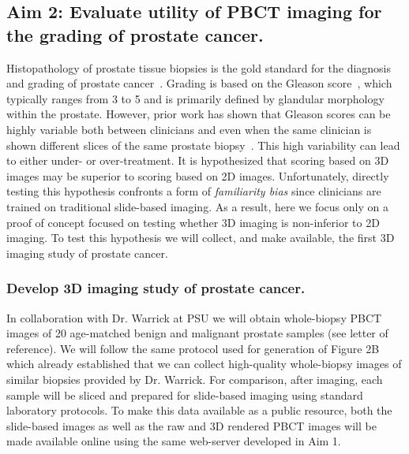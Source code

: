 \documentclass{NIHGrant}
\theoremstyle{theorem}
\begin{document}
\subsection*{Aim 2: Evaluate utility of PBCT imaging for the grading of prostate cancer.}
Histopathology of prostate tissue biopsies is the gold standard for the diagnosis and grading of prostate cancer~\cite{epstein_prostate_2018}.
Grading is based on the Gleason score~\cite{epstein_prostate_2018,ozkan_interobserver_2016,flach_significant_2021}, which typically ranges from 3 to 5 and is primarily defined by glandular morphology within the prostate.
However, prior work has shown that Gleason scores can be highly variable both
between clinicians and even when the same clinician is shown different slices of
the same prostate biopsy~\cite{koyuncu_visual_2023}.%
This high variability can lead to either under- or over-treatment. It is
hypothesized that scoring based on 3D images may be superior to scoring based on
2D images. Unfortunately, directly testing this hypothesis confronts a form of
\textit{familiarity bias} since clinicians are trained on traditional slide-based
imaging. As a result, here we focus only on a proof of concept focused on
testing whether 3D imaging is non-inferior to 2D imaging. To test this
hypothesis we will collect, and make available, the first 3D imaging study of
prostate cancer.

\subsubsection*{Develop 3D imaging study of prostate cancer.}
In collaboration with Dr. Warrick at PSU we will obtain whole-biopsy PBCT images of 20 age-matched benign and malignant prostate samples (see letter of reference). We will follow the same protocol used for generation of Figure 2B which already established that we can collect high-quality whole-biopsy images of similar biopsies provided by Dr. Warrick. For comparison, after imaging, each sample will be sliced and prepared for slide-based imaging using standard laboratory protocols. To make this data available as a public resource, both the slide-based images as well as the raw and 3D rendered PBCT images will be made available online using the same web-server developed in Aim 1.
\end{document}
